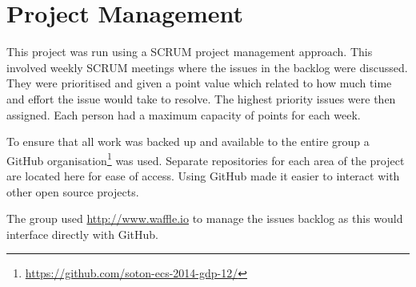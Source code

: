 \chapter{Project Management} 
\label{Chapter: Project Management}
This project was run using a SCRUM project management approach. This involved weekly SCRUM meetings where the issues in the backlog were discussed. They were prioritised and given a point value which related to how much time and effort the issue would take to resolve. The highest priority issues were then assigned. Each person had a maximum capacity of points for each week. 

To ensure that all work was backed up and available to the entire group a GitHub organisation\footnote{\url{https://github.com/soton-ecs-2014-gdp-12/}} was used. Separate repositories for each area of the project are located here for ease of access. Using GitHub made it easier to interact with other open source projects.

The group used \url{http://www.waffle.io} to manage the issues backlog as this would interface directly with GitHub.